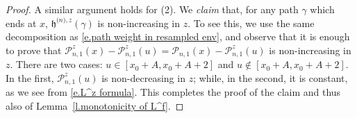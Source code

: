 \documentclass[oneside,final,11pt]{amsart}
\makeatletter
\theoremstyle{definition}
\newcommand{\Lsc}{\CP_n}
\newcommand{\Lscz}[1]{\CP_n^{#1}}
\renewcommand{\L}{\CP}
\newcommand{\fh}{\mathfrak{h}}
\newcommand{\hz}[1]{\fh^{{\scriptscriptstyle(}n{\scriptscriptstyle)},#1}}
\newcommand*\bigcdot{\mathpalette\bigcdot@{.5}}
\newcommand*\bigcdot@[2]{\mathbin{\vcenter{\hbox{\scalebox{#2}{$\m@th#1\bullet$}}}}}
\newcommand{\1}[1]{\mathbf{1}_{#1}}
\newcommand{\CP}{\mathcal{P}}
\numberwithin{equation}{section}
\makeatother
\begin{document}
\begin{proof}
A similar argument holds for (2). We {\em claim} that, for any path $\gamma$ which ends at $x$, $\hz{z}(\gamma)$ is non-increasing in $z$. To see this, we use the same decomposition as \eqref{e.path weight in resampled env}, and observe that it is enough to prove that $\L_{n,1}^z(x) - \L_{n,1}^z(u) = \L_{n,1}(x) - \L_{n,1}^z(u)$ is non-increasing in $z$. There are two cases: $u\in [x_0+A,x_0+A+ 2]$ and $u\not\in [x_0+A,x_0+A+2]$. In the first, $\L_{n,1}^z(u)$ is non-decreasing in $z$; while, in the second, it is constant, as we see from \eqref{e.L^z formula}.  This completes the proof of the claim and thus also of Lemma~\ref{l.monotonicity of L^f}.
%
%
%
%
%
\end{proof}
\end{document}
